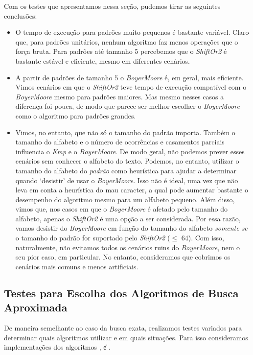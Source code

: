 \documentclass[]{article}
\begin{document}
Com os testes que apresentamos nessa seção, pudemos tirar as seguintes conclusões:
\begin{itemize}
	\item O tempo de execução para padrões muito pequenos é bastante variável. Claro que, para padrões unitários, nenhum algoritmo faz menos operações que o força bruta. Para padrões até tamanho 5 percebemos que o \textit{ShiftOr2} é bastante estável e eficiente, mesmo em diferentes cenários.
	
	\item A partir de padrões de tamanho 5 o \textit{BoyerMoore} é, em geral, mais eficiente. Vimos cenários em que o \textit{ShiftOr2} teve tempo de execução compatível com o \textit{BoyerMoore} mesmo para padrões maiores. Mas mesmo nesses casos a diferença foi pouca, de modo que parece ser melhor escolher o \textit{BoyerMoore} como o algoritmo para padrões grandes.
	
	\item Vimos, no entanto, que não só o tamanho do padrão importa. Também o tamanho do alfabeto e o número de ocorrências e casamentos parciais influencia o \textit{Kmp} e o \textit{BoyerMoore}. De modo geral, não podemos prever esses cenários sem conhecer o alfabeto do texto. Podemos, no entanto, utilizar o tamanho do alfabeto do \textit{padrão} como heurística para ajudar a determinar quando `desistir' de usar o \textit{BoyerMoore}. Isso não é ideal, uma vez que não leva em conta a heurística do mau caracter, a qual pode aumentar bastante o desempenho do algoritmo mesmo para um alfabeto pequeno. Além disso, vimos que, nos casos em que o \textit{BoyerMoore} é afetado pelo tamanho do alfabeto, apenas o \textit{ShiftOr2} é uma opção a ser considerada. Por essa razão, vamos desistir do \textit{BoyerMoore} em função do tamanho do alfabeto \textit{somente se} o tamanho do padrão for suportado pelo \textit{ShiftOr2} ($\leq$ 64). Com isso, naturalmente, não evitamos todos os cenários ruins do \textit{BoyerMoore}, nem o seu pior caso, em particular. No entanto, consideramos que cobrimos os cenários mais comuns e menos artificiais.
\end{itemize}

\subsection{Testes para Escolha dos Algoritmos de Busca Aproximada}

De maneira semelhante ao caso da busca exata, realizamos testes variados para determinar quais algoritmos utilizar e em quais situações. Para isso consideramos implementações dos algoritmos \W, \U e \SE.
\end{document}

